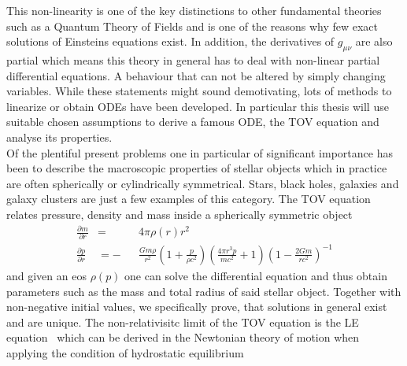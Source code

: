 This non-linearity is one of the key distinctions to other fundamental theories such as a Quantum Theory of Fields and is one of the reasons why few exact solutions of Einsteins equations exist.
In addition, the derivatives of $g_{\mu\nu}$ are also partial which means this theory in general has to deal with non-linear partial differential equations.
A behaviour that can not be altered by simply changing variables.
While these statements might sound demotivating, lots of methods to linearize or obtain \acp{ODE} have been developed.
In particular this thesis will use suitable chosen assumptions to derive a famous \ac{ODE}, the \ac{TOV} equation and analyse its properties.\\
Of the plentiful present problems one in particular of significant importance has been to describe the macroscopic properties of stellar objects which in practice are often spherically or cylindrically symmetrical.
Stars, black holes, galaxies and galaxy clusters are just a few examples of this category.
The \ac{TOV} equation~\cite{tolmanStaticSolutionsEinstein1939, oppenheimerMassiveNeutronCores1939} relates pressure, density and mass inside a spherically symmetric object
\begin{equation}
	\begin{aligned}
			\frac{\partial m}{\partial r} &= &&4\pi\rho(r)r^2\\
			\frac{\partial p}{\partial r} &= -&&\frac{Gm\rho}{r^2}\left(1+\frac{p}{\rho c^2}\right)\left(\frac{4\pi r^3 p}{mc^2}+1\right)\left(1-\frac{2Gm}{rc^2}\right)^{-1}
			\label{eq:01-Intr-TOV-Equation}
	\end{aligned}
\end{equation}
and given an \ac{eos} $\rho(p)$ one can solve the differential equation and thus obtain parameters such as the mass and total radius of said stellar object.
Together with non-negative initial values, we specifically prove, that solutions in general exist and are unique.
The non-relativisitc limit of the \ac{TOV} equation is the \ac{LE} equation~\cite{laneTheoreticalTemperatureSun1870, emdenGaskugeln1907} which can be derived in the Newtonian theory of motion when applying the condition of hydrostatic equilibrium
